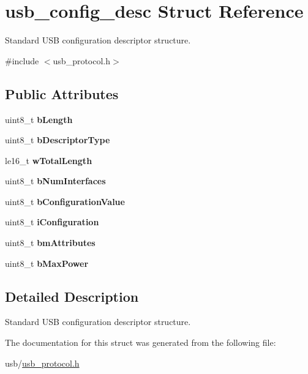 \hypertarget{structusb__config__desc}{}\section{usb\+\_\+config\+\_\+desc Struct Reference}
\label{structusb__config__desc}


Standard U\+SB configuration descriptor structure.  




{\ttfamily \#include $<$usb\+\_\+protocol.\+h$>$}

\subsection*{Public Attributes}
\begin{DoxyCompactItemize}
\item 
\mbox{\label{structusb__config__desc_a8f51fbcbfcaf6e87ddb6dbd4f1cf5990}} 
uint8\+\_\+t {\bfseries b\+Length}
\item 
\mbox{\label{structusb__config__desc_a104d976a6c71fe60d40fb254329d85c0}} 
uint8\+\_\+t {\bfseries b\+Descriptor\+Type}
\item 
\mbox{\label{structusb__config__desc_a94d96afc9fe565adb78c816c3ecc3c57}} 
le16\+\_\+t {\bfseries w\+Total\+Length}
\item 
\mbox{\label{structusb__config__desc_a3584ec768f28ec517e990c3fe59cd69d}} 
uint8\+\_\+t {\bfseries b\+Num\+Interfaces}
\item 
\mbox{\label{structusb__config__desc_a2929272f9f66638ff1e5bf83bc8f829c}} 
uint8\+\_\+t {\bfseries b\+Configuration\+Value}
\item 
\mbox{\label{structusb__config__desc_ac5d097f680642dc018361ae25ee4fcb7}} 
uint8\+\_\+t {\bfseries i\+Configuration}
\item 
\mbox{\label{structusb__config__desc_ad0dbf9271df896a15b781ef39ebd3bff}} 
uint8\+\_\+t {\bfseries bm\+Attributes}
\item 
\mbox{\label{structusb__config__desc_a0609a2b8d0d45718aa17408612af5f88}} 
uint8\+\_\+t {\bfseries b\+Max\+Power}
\end{DoxyCompactItemize}


\subsection{Detailed Description}
Standard U\+SB configuration descriptor structure. 

The documentation for this struct was generated from the following file\+:\begin{DoxyCompactItemize}
\item 
usb/\hyperlink{usb__protocol_8h}{usb\+\_\+protocol.\+h}\end{DoxyCompactItemize}
